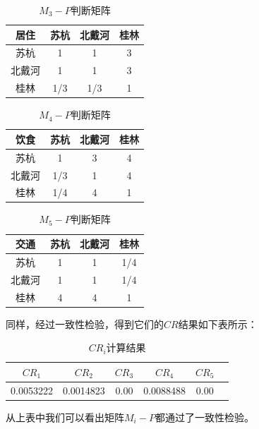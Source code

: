 \documentclass[a4paper]{article}
\begin{document}
    \begin{minipage}{\textwidth}
        \begin{minipage}[H]{0.5\linewidth}
            \centering
            \begin{table}[H]
                \centering
                \caption{$ M_{3}-P $判断矩阵}
                \begin{tabular}{|c|c|c|c|}
                    \hline
                    居住  & 苏杭  & 北戴河 & 桂林 \\ \hline
                    苏杭  & 1   & 1   & 3  \\ \hline
                    北戴河 & 1   & 1   & 3  \\ \hline
                    桂林  & 1/3 & 1/3 & 1  \\ \hline
                \end{tabular}
            \end{table}
        \end{minipage}
        \begin{minipage}[H]{0.5\linewidth}
            \centering
            \begin{table}[H]
                \centering
                \caption{$ M_{4}-P $判断矩阵}
                \begin{tabular}{|c|c|c|c|}
                    \hline
                    饮食  & 苏杭  & 北戴河 & 桂林 \\ \hline
                    苏杭  & 1   & 3   & 4  \\ \hline
                    北戴河 & 1/3 & 1   & 4  \\ \hline
                    桂林  & 1/4 & 4   & 1  \\ \hline
                \end{tabular}
            \end{table}
        \end{minipage}
    \end{minipage}
    \begin{table}[H]
        \centering
        \caption{$ M_{5}-P $判断矩阵}
        \begin{tabular}{|c|c|c|c|}
            \hline
            交通  & 苏杭 & 北戴河 & 桂林  \\ \hline
            苏杭  & 1  & 1   & 1/4 \\ \hline
            北戴河 & 1  & 1   & 1/4 \\ \hline
            桂林  & 4  & 4   & 1   \\ \hline
        \end{tabular}
    \end{table}
    同样，经过一致性检验，得到它们的$ CR $结果如下表所示： 
    \begin{table}[H]
        \centering
        \caption{ $ CR_{i} $计算结果}
        \begin{tabular}{@{}cccccc@{}}
          \toprule
          $ CR_{1} $ &  $ CR_{2} $ &  $ CR_{3} $ &  $ CR_{4} $ & $ CR_{5} $ \\ \midrule
            0.0053222 & 0.0014823 & 0.00 & 0.0088488 & 0.00 \\ 
          \bottomrule
        \end{tabular}
    \end{table}
    从上表中我们可以看出矩阵$ M_{i}-P $都通过了一致性检验。
\end{document}
